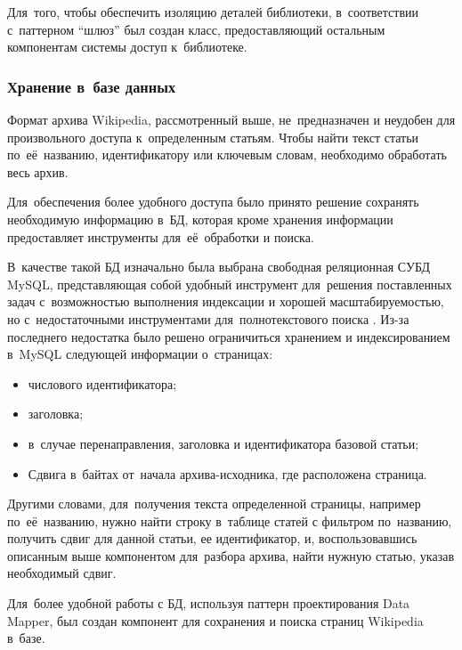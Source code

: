 Для~того, чтобы обеспечить изоляцию деталей библиотеки, 
в~соответствии с~паттерном ``шлюз'' \cite{patternGateway} был создан класс, 
предоставляющий остальным компонентам системы доступ к~библиотеке.

\subsubsection{Хранение в~базе данных}

Формат архива Wikipedia, рассмотренный выше, не~предназначен и неудобен для произвольного доступа к~определенным статьям. 
Чтобы найти текст статьи по~её~названию, идентификатору или ключевым словам,
необходимо обработать весь архив.

Для~обеспечения более удобного доступа было принято решение сохранять необходимую информацию в~БД,
которая кроме хранения информации предоставляет инструменты для~её~обработки и поиска.

В~качестве такой БД изначально была выбрана свободная реляционная 
СУБД MySQL, представляющая собой удобный инструмент для~решения поставленных задач 
с~возможностью выполнения индексации и хорошей масштабируемостью, 
но с~недостаточными инструментами для~полнотекстового поиска \cite{mysql}.
Из-за последнего недостатка было решено ограничиться хранением и индексированием в~MySQL следующей информации о~страницах:

\begin{itemize}

\item{числового идентификатора;}
\item {заголовка;}
\item {в~случае перенаправления, заголовка и идентификатора базовой статьи;}

\item {
Сдвига в~байтах от~начала архива-исходника, 
где расположена страница.
}

\end{itemize}

Другими словами, для~получения текста определенной страницы, например по~её~названию,
нужно найти строку в~таблице статей с фильтром по~названию,
получить сдвиг для данной статьи, ее идентификатор, и, 
воспользовавшись описанным выше компонентом для~разбора архива, найти нужную статью, 
указав необходимый сдвиг.

Для~более удобной работы с БД, используя паттерн проектирования Data Mapper\cite{patternMapper}, 
был создан компонент для сохранения и поиска страниц Wikipedia в~базе.

